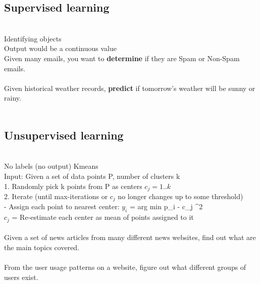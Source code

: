 \documentclass[11pt]{article}
\begin{document}
\subsection*{Supervised learning}\\
Identifying objects \\
Output would be a continuous value\\
Given many emails, you want to \textbf{determine} if they are Spam or Non-Spam emails.
\\
\\
Given historical weather records, \textbf{predict} if tomorrow's weather will be sunny or rainy.
\\\\
\subsection*{Unsupervised learning}\\
No labels (no output)
Kmeans 
\\
Input: Given a set of data points P, number of clusters k
\\1. Randomly pick k points from P as centers $c_{j} = 1.. k$
 \\2.
Iterate (until max-iterations or $c_{j}$ no longer changes up to some threshold) \\
- Assign each point to nearest center: $y_{i}$ = arg min {\parallel p_{i} - c_{j} \parallel}^{2}\)
\\
$c_{j}$ =  Re-estimate each center as mean of points assigned to it
\\\\
Given a set of news articles from many different news websites, find out what are the main topics covered.
\\\\
From the user usage patterns on a website, figure out what different groups of users exist.
\end{document}
